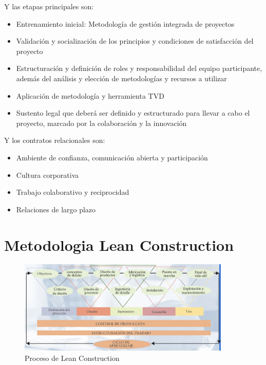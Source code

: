 Y las etapas principales son:

\begin{itemize}
    \item Entrenamiento inicial: Metodología de gestión integrada de proyectos
    \item Validación y socialización de los principios y condiciones de satisfacción del proyecto
    \item Estructuración y definición de roles y responsabilidad del equipo participante, además del análisis y elección de metodologías y recursos a utilizar
    \item Aplicación de metodología y herramienta TVD
    \item Sustento legal que deberá ser definido y estructurado para llevar a cabo el proyecto, marcado por la colaboración y la innovación
\end{itemize}

Y los contratos relacionales son:

\begin{itemize}
    \item Ambiente de confianza, comunicación abierta y participación
    \item Cultura corporativa
    \item Trabajo colaborativo y reciprocidad
    \item Relaciones de largo plazo
\end{itemize}

\section{Metodologia Lean Construction}

\begin{figure}[H]
\centering
\includegraphics[width=0.9\textwidth]{IMAGENES/LEAN.png}
\caption{Proceso de Lean Construction}
\label{fig:lean}
\end{figure}

